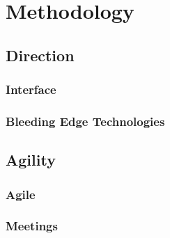 \chapter{Methodology}	%

\section{Direction}
\subsection{Interface}

\subsection{Bleeding Edge Technologies}

\section{Agility}
\subsection{Agile}

\subsection{Meetings}

